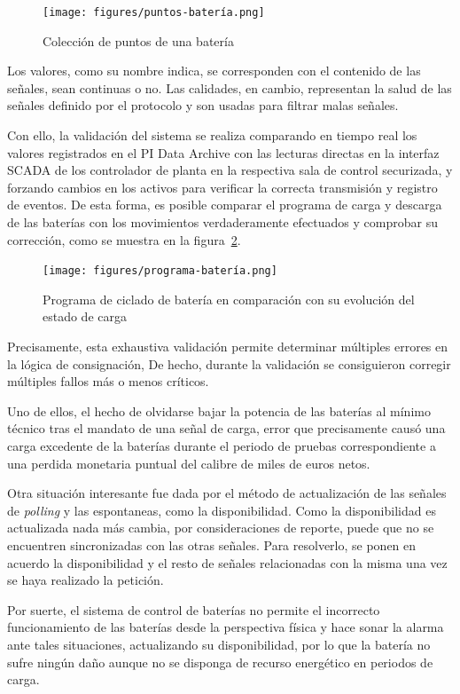\begin{figure}
\centering
\texttt{[image: figures/puntos-batería.png]}
\caption{Colección de puntos de una batería}
\label{fig:puntos-batería}
\end{figure}

Los valores, como su nombre indica, se corresponden con el contenido de las señales, sean continuas o no. Las calidades, en cambio, representan la salud de las señales definido por el protocolo y son usadas para filtrar malas señales.

Con ello, la validación del sistema se realiza comparando en tiempo real los valores registrados en el PI Data Archive con las lecturas directas en la interfaz SCADA de los controlador de planta en la respectiva sala de control securizada, y forzando cambios en los activos para verificar la correcta transmisión y registro de eventos. De esta forma, es posible comparar el programa de carga y descarga de las baterías con los movimientos verdaderamente efectuados y comprobar su corrección, como se muestra en la figura~\ref{fig:programa-batería}.

\begin{figure}
\centering
\texttt{[image: figures/programa-batería.png]}
\caption{Programa de ciclado de batería en comparación con su evolución del estado de carga}
\label{fig:programa-batería}
\end{figure}

Precisamente, esta exhaustiva validación permite determinar múltiples errores en la lógica de consignación, De hecho, durante la validación se consiguieron corregir múltiples fallos más o menos críticos.

Uno de ellos, el hecho de olvidarse bajar la potencia de las baterías al mínimo técnico tras el mandato de una señal de carga, error que precisamente causó una carga excedente de la baterías durante el periodo de pruebas correspondiente a una perdida monetaria puntual del calibre de miles de euros netos.

Otra situación interesante fue dada por el método de actualización de las señales de \textit{polling} y las espontaneas, como la disponibilidad. Como la disponibilidad es actualizada nada más cambia, por consideraciones de reporte, puede que no se encuentren sincronizadas con las otras señales. Para resolverlo, se ponen en acuerdo la disponibilidad y el resto de señales relacionadas con la misma una vez se haya realizado la petición.

Por suerte, el sistema de control de baterías no permite el incorrecto funcionamiento de las baterías desde la perspectiva física y hace sonar la alarma ante tales situaciones, actualizando su disponibilidad, por lo que la batería no sufre ningún daño aunque no se disponga de recurso energético en periodos de carga.

